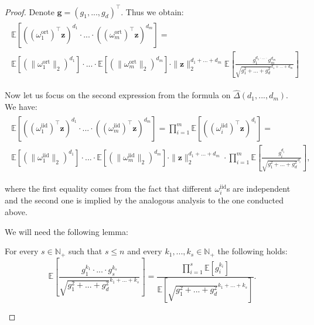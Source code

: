 \begin{proof}
Denote $\mathbf{g}=(g_{1},...,g_{d})^{\top}$.
Thus we obtain:
\begin{align}
\begin{split}
\label{lhs}
\mathbb{E}[((\omega_{1}^{\mathrm{ort}})^{\top}\mathbf{z})^{d_{1}} \cdot ... \cdot ((\omega_{m}^{\mathrm{ort}})^{\top}\mathbf{z})^{d_{m}}] = \\ \mathbb{E}[(\|\omega_{1}^{\mathrm{ort}}\|_{2})^{d_{1}}] \cdot ... \cdot \mathbb{E}[(\|\omega_{m}^{\mathrm{ort}}\|_{2})^{d_{m}}] \cdot 
\|\mathbf{z}\|_{2}^{d_{1}+...+d_{m}} \mathbb{E}[\frac{g_{1}^{d_{1} \cdot ... \cdot}g_{m}^{d_{m}}}{\sqrt{g_{1}^{2}+...+g_{d}^{2}}^{d_{1}+...+d_{m}}}]
\end{split}
\end{align}

Now let us focus on the second expression from the formula on $\widehat{\Delta}(d_{1},...,d_{m})$. We have:
\begin{align}
\begin{split}
\label{rhs}
\mathbb{E}[((\omega_{1}^{\mathrm{iid}})^{\top}\mathbf{z})^{d_{1}} \cdot ... \cdot ((\omega_{m}^{\mathrm{iid}})^{\top}\mathbf{z})^{d_{m}}] = \prod_{i=1}^{m} \mathbb{E}[((\omega_{i}^{\mathrm{iid}})^{\top}\mathbf{z})^{d_{i}}]   
= \\ \mathbb{E}[(\|\omega_{1}^{\mathrm{iid}}\|_{2})^{d_{1}}] \cdot ... \cdot \mathbb{E}[(\|\omega_{m}^{\mathrm{iid}}\|_{2})^{d_{m}}] \cdot \|\mathbf{z}\|_{2}^{d_{1}+...+d_{m}} \cdot \prod_{i=1}^{m} \mathbb{E}[\frac{g_{i}^{d_{i}}}{\sqrt{g_{1}^{2}+...+g_{d}^{2}}^{d_{i}}}],
\end{split}
\end{align}

where the first equality comes from the fact that
different $\omega_{i}^{\mathrm{iid}}$s are independent and the second one is implied by the analogous analysis to the one conducted above.

We will need the following lemma:

\begin{lemma}
\label{useful-lemma}
For every $s \in \mathbb{N}_{+}$ such that $s \leq n$ and every $k_{1},...,k_{s} \in \mathbb{N}_{+}$ the following holds:
\begin{equation}
\mathbb{E}[\frac{g_{1}^{k_{1}} \cdot ... \cdot g_{s}^{k_{s}}}{\sqrt{g_{1}^{2}+...+g_{d}^{2}}^{k_{1}+...+k_{s}}}] = \frac{\prod_{i=1}^{s}\mathbb{E}[g_{i}^{k_{i}}]}{\mathbb{E}[\sqrt{g_{1}^{2}+...+g_{d}^{2}}^{k_{1}+...+k_{s}}]}.    
\end{equation}
\end{lemma}


\end{proof}
